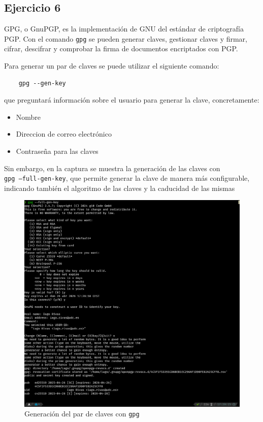 \subsection{Ejercicio 6}
\graphicspath{ {img/06} }

GPG, o GnuPGP, es la implementación de GNU del estándar de criptografía PGP. Con el comando \texttt{gpg} se pueden generar claves, gestionar claves y firmar, cifrar, descifrar y comprobar la firma de documentos encriptados con PGP.

Para generar un par de claves se puede utilizar el siguiente comando:
\begin{verbatim}
    gpg --gen-key
\end{verbatim}

que preguntará información sobre el usuario para generar la clave, concretamente:
\begin{itemize}
    \item{Nombre}
    \item{Direccion de correo electrónico}
    \item{Contraseña para las claves}
\end{itemize}

Sin embargo, en la captura se muestra la generación de las claves con \\ \texttt{gpg --full-gen-key}, que permite generar la clave de manera más configurable, indicando también el algoritmo de las claves y la caducidad de las mismas

\begin{figure}[H]
    \includegraphics[width=\textwidth]{gpg-genkey.png}
    \caption{Generación del par de claves con \texttt{gpg}}
\end{figure}

